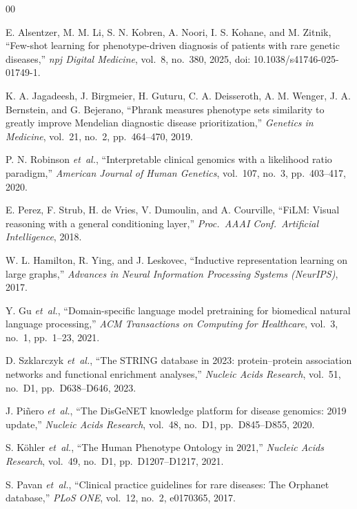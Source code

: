 \documentclass[conference]{IEEEtran}
\begin{document}
\begin{thebibliography}{00}

E. Alsentzer, M. M. Li, S. N. Kobren, A. Noori, I. S. Kohane, and M. Zitnik,
``Few-shot learning for phenotype-driven diagnosis of patients with rare genetic diseases,''
\emph{npj Digital Medicine}, vol.\ 8, no.\ 380, 2025, doi: 10.1038/s41746-025-01749-1.

K. A. Jagadeesh, J. Birgmeier, H. Guturu, C. A. Deisseroth, A. M. Wenger, J. A. Bernstein, and G. Bejerano,
``Phrank measures phenotype sets similarity to greatly improve Mendelian diagnostic disease prioritization,''
\emph{Genetics in Medicine}, vol.\ 21, no.\ 2, pp.\ 464--470, 2019.

P. N. Robinson \emph{et~al.},
``Interpretable clinical genomics with a likelihood ratio paradigm,''
\emph{American Journal of Human Genetics}, vol.\ 107, no.\ 3, pp.\ 403--417, 2020.

E. Perez, F. Strub, H. de Vries, V. Dumoulin, and A. Courville,
``FiLM: Visual reasoning with a general conditioning layer,''
\emph{Proc.\ AAAI Conf.\ Artificial Intelligence}, 2018.

W. L. Hamilton, R. Ying, and J. Leskovec,
``Inductive representation learning on large graphs,''
\emph{Advances in Neural Information Processing Systems (NeurIPS)}, 2017.

Y. Gu \emph{et~al.},
``Domain-specific language model pretraining for biomedical natural language processing,''
\emph{ACM Transactions on Computing for Healthcare}, vol.\ 3, no.\ 1, pp.\ 1--23, 2021.

D. Szklarczyk \emph{et~al.},
``The STRING database in 2023: protein--protein association networks and functional enrichment analyses,''
\emph{Nucleic Acids Research}, vol.\ 51, no.\ D1, pp.\ D638--D646, 2023.

J. Pi\~nero \emph{et~al.},
``The DisGeNET knowledge platform for disease genomics: 2019 update,''
\emph{Nucleic Acids Research}, vol.\ 48, no.\ D1, pp.\ D845--D855, 2020.

S. K\"ohler \emph{et~al.},
``The Human Phenotype Ontology in 2021,''
\emph{Nucleic Acids Research}, vol.\ 49, no.\ D1, pp.\ D1207--D1217, 2021.

S. Pavan \emph{et~al.},
``Clinical practice guidelines for rare diseases: The Orphanet database,''
\emph{PLoS ONE}, vol.\ 12, no.\ 2, e0170365, 2017.

\end{thebibliography}
\end{document}
